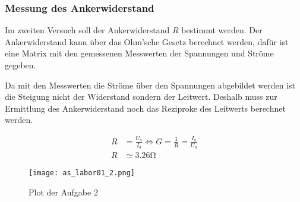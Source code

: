 \subsubsection{Messung des Ankerwiderstand}

Im zweiten Versuch soll der Ankerwiderstand $R$ bestimmt werden.
Der Ankerwiderstand kann über das Ohm'sche Gesetz berechnet werden,
dafür ist eine Matrix mit den gemessenen Messwerten der Spannungen
und Ströme gegeben.

Da mit den Messwerten die Ströme über den Spannungen abgebildet werden ist die
Steigung nicht der Widerstand sondern der Leitwert. Deshalb muss zur Ermittlung
des Ankerwiderstand noch das Reziproke des Leitwerts berechnet werden.

\begin{equation} \label{eq121}
    \begin{split}
        R&=\frac{U_a}{I_a} \Leftrightarrow G=\frac{1}{R}=\frac{I_a}{U_a}\\
        R&\simeq 3.26 \mathrm{\Omega}
    \end{split}
\end{equation}

\begin{figure}[H]
 \centering
 \texttt{[image: as\_labor01\_2.png]}
 \caption{Plot der Aufgabe 2}
 \label{fig:PlotAufgabe2}
\end{figure}